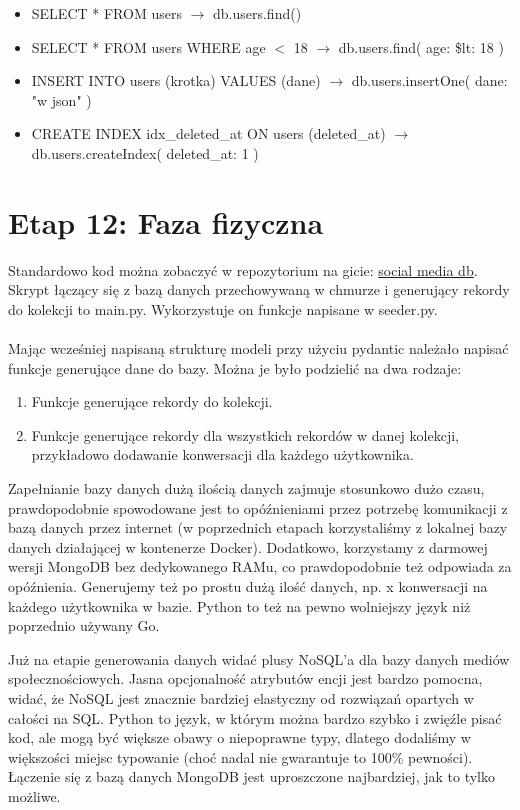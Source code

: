 \documentclass{article}
\begin{document}
\begin{itemize}
    \item SELECT * FROM users $\rightarrow$ db.users.find()
    \item SELECT * FROM users WHERE age $<$ 18 $\rightarrow$ db.users.find({ age: { \$lt: 18 } })
    \item INSERT INTO users (krotka) VALUES (dane) $\rightarrow$ db.users.insertOne({ dane: "w json" })
    \item CREATE INDEX idx\_deleted\_at ON users (deleted\_at) $\rightarrow$ db.users.createIndex({ deleted\_at: 1 })
\end{itemize}

\section{Etap 12: Faza fizyczna }

\quad Standardowo kod można zobaczyć w repozytorium na gicie: \href{https://github.com/lukaszfabia/social_media_db}{social media db}. Skrypt łączący się z bazą danych przechowywaną w chmurze i generujący rekordy do kolekcji to main.py. Wykorzystuje on funkcje napisane w seeder.py.\\\\

\quad Mając wcześniej napisaną strukturę modeli przy użyciu pydantic należało napisać funkcje generujące dane do bazy. Można je było podzielić na dwa rodzaje:

\begin{enumerate}
    \item Funkcje generujące rekordy do kolekcji.
    \item Funkcje generujące rekordy dla wszystkich rekordów w danej kolekcji, przykładowo dodawanie konwersacji dla każdego użytkownika.
\end{enumerate}

Zapełnianie bazy danych dużą ilością danych zajmuje stosunkowo dużo czasu, prawdopodobnie spowodowane jest to opóźnieniami przez potrzebę komunikacji z bazą danych przez internet (w poprzednich etapach korzystaliśmy z lokalnej bazy danych działającej w kontenerze Docker). Dodatkowo, korzystamy z darmowej wersji MongoDB bez dedykowanego RAMu, co prawdopodobnie też odpowiada za opóźnienia. Generujemy też po prostu dużą ilość danych, np. x konwersacji na każdego użytkownika w bazie. Python to też na pewno wolniejszy język niż poprzednio używany Go.

Już na etapie generowania danych widać plusy NoSQL'a dla bazy danych mediów społecznościowych. Jasna opcjonalność atrybutów encji jest bardzo pomocna, widać, że NoSQL jest znacznie bardziej elastyczny od rozwiązań opartych w całości na SQL. Python to język, w którym można bardzo szybko i zwięźle pisać kod, ale mogą być większe obawy o niepoprawne typy, dlatego dodaliśmy w większości miejsc typowanie (choć nadal nie gwarantuje to 100\% pewności). Łączenie się z bazą danych MongoDB jest uproszczone najbardziej, jak to tylko możliwe.
\end{document}
